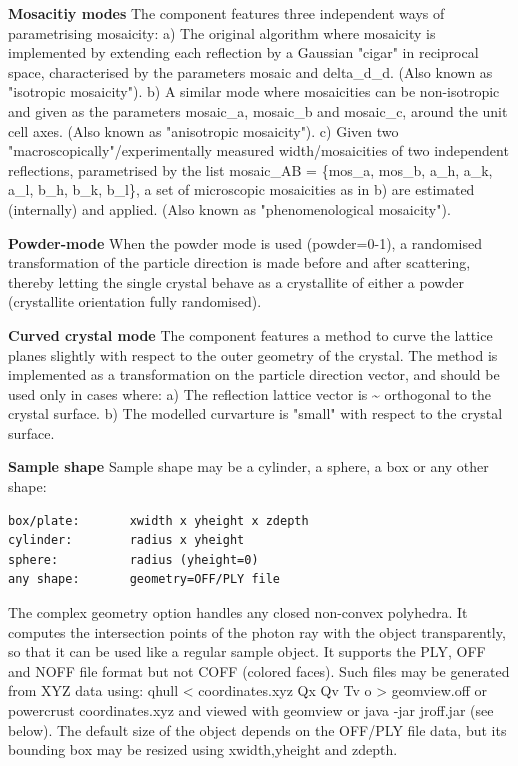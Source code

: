 \textbf{Mosacitiy modes} The component features three independent ways of parametrising mosaicity: a) The original algorithm where mosaicity is implemented by extending each reflection by a Gaussian "cigar" in reciprocal space, characterised by the parameters mosaic and delta\_d\_d. (Also known as "isotropic mosaicity"). b) A similar mode where mosaicities can be non-isotropic and given as the parameters mosaic\_a, mosaic\_b and mosaic\_c, around the unit cell axes. (Also known as "anisotropic mosaicity"). c) Given two "macroscopically"/experimentally measured width/mosaicities of two independent reflections, parametrised by the list mosaic\_AB = \{mos\_a, mos\_b, a\_h, a\_k, a\_l, b\_h, b\_k, b\_l\}, a set of microscopic mosaicities as in b) are estimated (internally) and applied. (Also known as "phenomenological mosaicity").

\textbf{Powder-mode} When the powder mode is used (powder=0-1), a randomised transformation of the particle direction is made before and after scattering, thereby letting the single crystal behave as a crystallite of either a powder (crystallite orientation fully randomised).

\textbf{Curved crystal mode} The component features a method to curve the lattice planes slightly with respect to the outer geometry of the crystal. The method is implemented as a transformation on the particle direction vector, and should be used only in cases where: a) The reflection lattice vector is \textasciitilde{} orthogonal to the crystal surface. b) The modelled curvarture is "small" with respect to the crystal surface.

\textbf{Sample shape} Sample shape may be a cylinder, a sphere, a box or any other shape:

\begin{verbatim}
box/plate:       xwidth x yheight x zdepth
cylinder:        radius x yheight
sphere:          radius (yheight=0)
any shape:       geometry=OFF/PLY file
\end{verbatim}

The complex geometry option handles any closed non-convex polyhedra. It computes the intersection points of the photon ray with the object transparently, so that it can be used like a regular sample object. It supports the PLY, OFF and NOFF file format but not COFF (colored faces). Such files may be generated from XYZ data using: qhull \textless{} coordinates.xyz Qx Qv Tv o \textgreater{} geomview.off or powercrust coordinates.xyz and viewed with geomview or java -jar jroff.jar (see below). The default size of the object depends on the OFF/PLY file data, but its bounding box may be resized using xwidth,yheight and zdepth.

